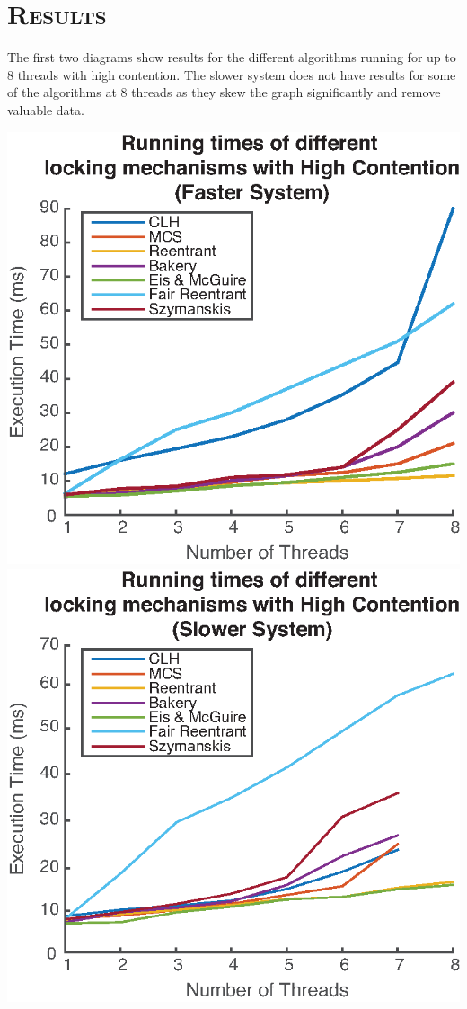 \documentclass[FinalReport.tex]{subfiles}
\begin{document}
\bigskip

\section*{\textsc{\Large Results}}

The first two diagrams show results for the different algorithms running for up to 8 threads with high contention. The slower system does not have results for some of the algorithms at 8 threads as they skew the graph significantly and remove valuable data.


\bigskip


	\includegraphics[scale = .8]{figures/myComp_1-8_1000.eps}
	\includegraphics[scale = .8]{figures/evanComp_1-8_1000.eps}
\end{document}
